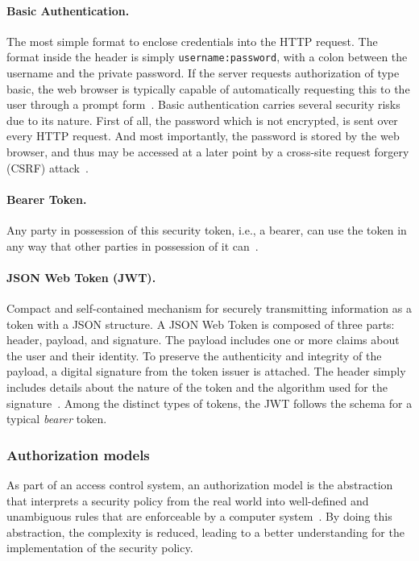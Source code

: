 \documentclass[12pt]{article}
\begin{document}
\paragraph{Basic Authentication.} The most simple format to enclose credentials into the HTTP request. The format inside the header is simply \texttt{username:password}, with a colon between the username and the private password. If the server requests authorization of type basic, the web browser is typically capable of automatically requesting this to the user through a prompt form~\cite{RFC7617}. Basic authentication carries several security risks due to its nature. First of all, the password which is not encrypted, is sent over every HTTP request. And most importantly, the password is stored by the web browser, and thus may be accessed at a later point by a cross-site request forgery (CSRF) attack~\cite{basic_01}.

\paragraph{Bearer Token.} Any party in possession of this security token, i.e., a bearer, can use the token in any way that other parties in possession of it can~\cite{RFC6750}.

\paragraph{JSON Web Token (JWT).} Compact and self-contained mechanism for securely transmitting information as a token with a JSON structure. A JSON Web Token is composed of three parts: header, payload, and signature. The payload includes one or more claims about the user and their identity. To preserve the authenticity and integrity of the payload, a digital signature from the token issuer is attached. The header simply includes details about the nature of the token and the algorithm used for the signature~\cite{RFC7519}. Among the distinct types of tokens, the JWT follows the schema for a typical \emph{bearer} token. 

\subsubsection{Authorization models}

As part of an access control system, an authorization model is the abstraction that interprets a security policy from the real world into well-defined and unambiguous rules that are enforceable by a computer system~\cite{access_01}. By doing this abstraction, the complexity is reduced, leading to a better understanding for the implementation of the security policy. 
\end{document}
